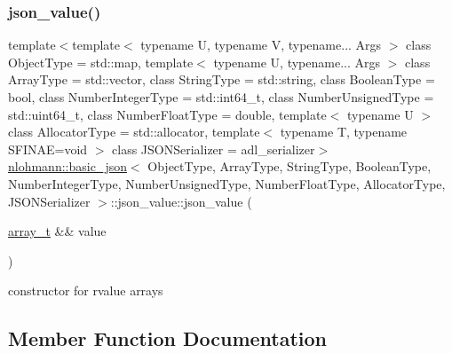 \subsubsection{\texorpdfstring{json\+\_\+value()}{json\_value()}\hspace{0.1cm}{\footnotesize\ttfamily [12/12]}}
{\footnotesize\ttfamily template$<$template$<$ typename U, typename V, typename... Args $>$ class Object\+Type = std\+::map, template$<$ typename U, typename... Args $>$ class Array\+Type = std\+::vector, class String\+Type  = std\+::string, class Boolean\+Type  = bool, class Number\+Integer\+Type  = std\+::int64\+\_\+t, class Number\+Unsigned\+Type  = std\+::uint64\+\_\+t, class Number\+Float\+Type  = double, template$<$ typename U $>$ class Allocator\+Type = std\+::allocator, template$<$ typename T, typename S\+F\+I\+N\+A\+E=void $>$ class J\+S\+O\+N\+Serializer = adl\+\_\+serializer$>$ \\
\hyperlink{classnlohmann_1_1basic__json}{nlohmann\+::basic\+\_\+json}$<$ Object\+Type, Array\+Type, String\+Type, Boolean\+Type, Number\+Integer\+Type, Number\+Unsigned\+Type, Number\+Float\+Type, Allocator\+Type, J\+S\+O\+N\+Serializer $>$\+::json\+\_\+value\+::json\+\_\+value (\begin{DoxyParamCaption}\item[{\hyperlink{classnlohmann_1_1basic__json_ae095578e03df97c5b3991787f1056374}{array\+\_\+t} \&\&}]{value }\end{DoxyParamCaption})\hspace{0.3cm}{\ttfamily [inline]}}



constructor for rvalue arrays 



\subsection{Member Function Documentation}
\mbox{\label{unionnlohmann_1_1basic__json_1_1json__value_ad54d0055a5cbb83b7ebe9c0950afd398}} 
